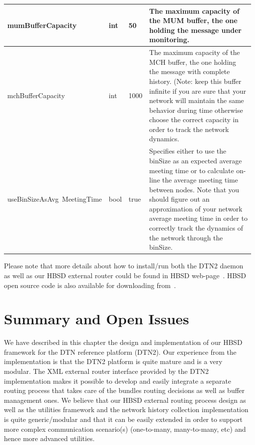 \begin{longtable}[!h]{|p{4cm}|p{1cm}|p{2.2cm}|p{5cm}|}
\hline
mumBufferCapacity & int & 50& The maximum capacity of the MUM buffer, the one holding the message under monitoring. \\
\hline
mchBufferCapacity & int & 1000 & The maximum capacity of the MCH buffer, the one holding the message with complete history. 
(Note: keep this  buffer infinite if you are sure that your network will maintain the same behavior during time otherwise choose the correct capacity in order to track the network dynamics.\\
\hline
useBinSizeAsAvg\ MeetingTime & bool & true& Specifies either to use the binSize as an expected average meeting time or to calculate on-line the average meeting time between nodes. Note that you should figure out an approximation of your network average meeting time in order to correctly track the dynamics of the network  through the binSize.\\
\hline
\end{longtable}

Please note that more details about how to install/run both the DTN2 daemon as well as our HBSD external router could be found in HBSD web-page~\cite{HBSDDTN2}. HBSD open source code is also available for downloading from~\cite{HBSDDTN2}. 

\section{Summary and Open Issues}

We have described in this chapter the design and implementation of our HBSD framework for the DTN reference platform (DTN2). Our experience from the implementation is that the DTN2 platform is quite mature and is a very modular. The XML external router interface provided by the DTN2 implementation makes it possible to develop and easily integrate a separate routing process that takes care of the bundles routing decisions as well as buffer management ones. We believe that our HBSD external routing process design as well as the utilities framework and the network history collection implementation is quite generic/modular and that it can be easily extended in order to support more complex communication scenario(s) (one-to-many, many-to-many, etc) and hence more advanced utilities.  

